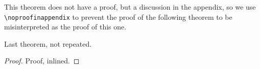 \begin{toappendix}
  This theorem does not have a proof, but a discussion in the appendix,
  so we use \verb|\noproofinappendix| to prevent the proof of the
  following theorem to be misinterpreted as the proof of this one.
\end{toappendix}

\begin{theorem}
  Last theorem, not repeated.
\end{theorem}

\begin{proof}
  Proof, inlined.
\end{proof}






